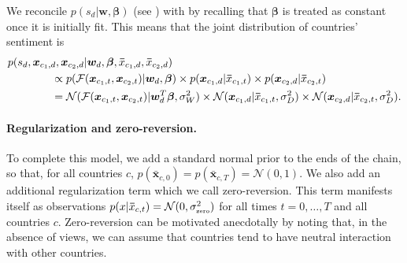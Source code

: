 We reconcile $p(s_d | \bm w, \bm \beta)$ (see )
with  by recalling that $\bm \beta$ is treated as
constant once it is initially fit.  This means that the joint distribution
of countries' sentiment is
\begin{align}
  p(s_d, \bm x_{c_1,d}, \bm x_{c_2,d} | \bm w_d, \bm \beta, \bm \bar
  x_{c_1, d}, \bm \bar x_{c_2, d}) & \nonumber \\
  & \hspace{-110pt} \propto
  p( \mathcal{F}(\bm x_{c_1,t}, \bm x_{c_2,t}) | \bm w_d, \bm \beta)
  \times p(\bm x_{c_1,d} | \bm \bar x_{c_1, t} )
  \times p(\bm x_{c_2,d} | \bm \bar x_{c_2, t} ) \nonumber \\
  & \hspace{-110pt} =
  \mathcal{N}( \mathcal{F}(\bm x_{c_1,t}, \bm x_{c_2,t}) |
  \bm w_d^T \bm \beta, \sigma_W^2 )
  \times \mathcal{N}(\bm x_{c_1,d} | \bm \bar x_{c_1, t}, \sigma_D^2)
  \times \mathcal{N}(\bm x_{c_2,d} | \bm \bar x_{c_2, t}, \sigma_D^2).
\end{align}

\paragraph{Regularization and zero-reversion.} To complete this model,
we add a standard normal prior to the ends of the chain, so that, for
all countries $c$, $p(\bm \bar x_{c, 0}) = p(\bm \bar x_{c,T}) =
\mathcal{N}(0, 1)$.  We also add an additional regularization term
which we call zero-reversion.  This term manifests itself as
observations $p(x | \bm \bar x_{c, t}) = \mathcal{N}(0,
\sigma_{\mbox{\tiny zero}}^2)$ for all times $t = 0, \ldots, T$ and
all countries $c$.  Zero-reversion can be motivated anecdotally by
noting that, in the absence of views, we can assume that countries
tend to have neutral interaction with other countries.



